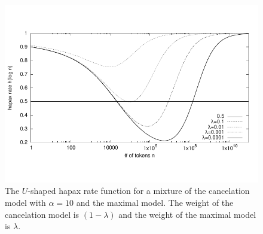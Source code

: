\documentclass[a4paper,12pt]{article}
\begin{document}
\begin{figure}[t]
  \centering
  \includegraphics[width=\columnwidth]{output/token_ratio.pdf}
  \caption{The $U$-shaped hapax rate function for a mixture of the
    cancelation model with $\alpha=10$ and the maximal model. The weight of
    the cancelation model is $(1-\lambda)$ and the weight of the maximal
    model is $\lambda$. \label{figHapaxU}}
\end{figure}
\end{document}
